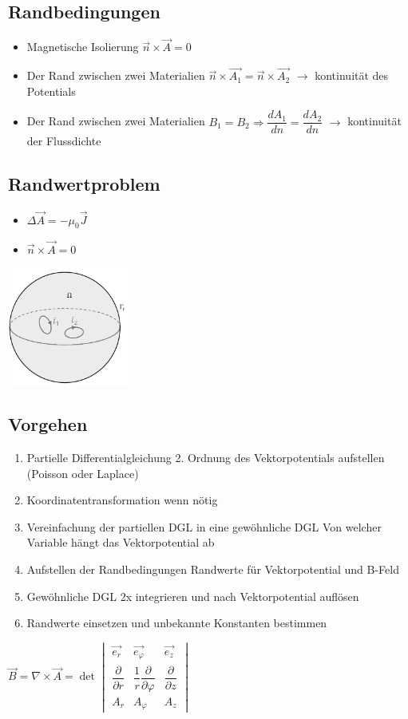 \subsection{Randbedingungen}
\begin{itemize}
	\item Magnetische Isolierung $\vec{n} \times \vec{A} =0$
	\item Der Rand zwischen zwei Materialien $\vec{n} \times \vec{A_{1}}=\vec{n} \times \vec{A_{2}}$ \qquad$\rightarrow$ kontinuität des Potentials
	\item Der Rand zwischen zwei Materialien $B_{1}=B_{2} \Rightarrow \dfrac{dA_{1}}{d n}=\dfrac{dA_{2}}{d n} $ $\rightarrow$ kontinuität der Flussdichte
\end{itemize}
\subsection{Randwertproblem}
\begin{minipage}{8cm}
	\begin{itemize}
		\item $\Delta\vec{A}=-\mu_{0}\vec{J}$
		\item $\vec{n} \times \vec{A} =0$
	\end{itemize}	
\end{minipage}
\begin{minipage}{8cm}
	\includegraphics[width=4cm]{images/Randwertproblem.jpg}
\end{minipage}
\subsection{Vorgehen}
	\begin{enumerate}
		\item Partielle Differentialgleichung 2. Ordnung des Vektorpotentials aufstellen (Poisson oder Laplace)
		\item Koordinatentransformation wenn nötig
		\item Vereinfachung der partiellen DGL in eine gewöhnliche DGL 
		\subitem Von welcher Variable hängt das Vektorpotential ab
		\item Aufstellen der Randbedingungen
		\subitem Randwerte für Vektorpotential und B-Feld
		\item Gewöhnliche DGL 2x integrieren und nach Vektorpotential auflösen
		\item Randwerte einsetzen und unbekannte Konstanten bestimmen
	\end{enumerate}

$\boxed{\vec B=\nabla\times\vec{A} = 
	\det
	\begin{vmatrix}
	\vec{e_r} & \vec{e_{\varphi}}&\vec{e_z}\\
	\dfrac{\partial}{\partial r} & \dfrac{1}{r}\dfrac{\partial}{\partial \varphi}& \dfrac{\partial}{\partial z}\\
	A_r& A_{\varphi} & A_z
	\end{vmatrix}}$
\clearpage
\pagebreak
